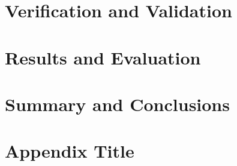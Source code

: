 \documentclass[a4paper, 12pt, oneside]{report} %
\begin{document}
\chapter{Verification and Validation}

\chapter{Results and Evaluation}
\citep{blackholes}
\citep{Abedon1994}
\citep{AbedonHymanThomas2003}
\citep{website:fermentas-lambda}

\chapter{Summary and Conclusions}




\appendix
\chapter{Appendix Title}

\end{document}
